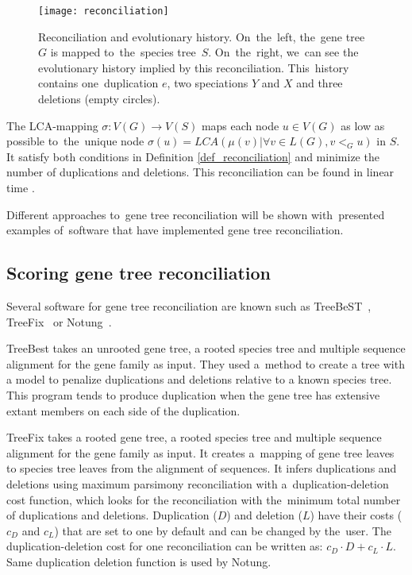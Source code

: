 \begin{figure}[h]
	\centering
	\label{reconciliation}
  	\texttt{[image: reconciliation]}
  	\caption{Reconciliation and evolutionary history. On~the~left, the~gene tree~$G$ is mapped to~the~species tree~$S$. On~the~right, we~can see the evolutionary history implied by this reconciliation. This~history contains one~duplication $e$, two speciations $Y$ and $X$ and three deletions (empty circles).}
\end{figure}

The LCA-mapping $\sigma: V(G) \rightarrow V(S)$ maps each node $u \in V(G)$ as low as possible to~the~unique node $\sigma(u) = LCA(\mu(v) | \forall v \in L(G), v<_Gu)$ in $S$. It satisfy both conditions in Definition \ref{def_reconciliation} and minimize the number of duplications and deletions. This reconciliation can be found in linear time \cite{hasic}.

Different approaches to~gene tree reconciliation will be shown with~presented examples of~software that have implemented gene tree reconciliation. 


\subsection{Scoring gene tree reconciliation}
Several software for gene tree reconciliation are known such as TreeBeST~\cite{treebest}, TreeFix~\cite{treefix} or Notung~\cite{notung}. 

TreeBest takes an unrooted gene tree, a rooted species tree and multiple sequence alignment for the gene family as input. They used a~method to create a tree with a model to penalize duplications and deletions relative to a known species tree. This program tends to produce duplication when the gene tree has extensive extant members on each side of the duplication.

TreeFix takes a rooted gene tree, a rooted species tree and multiple sequence alignment for the gene family as input. It creates a~mapping of gene tree leaves to species tree leaves from the alignment of sequences. It infers duplications and deletions using maximum parsimony reconciliation with a~duplication-deletion cost function, which looks for the reconciliation with the~minimum total number of duplications and deletions. Duplication ($D$) and deletion ($L$) have their costs ($c_D$ and $c_L$) that are set to one by default and can be changed by the~user. The duplication-deletion cost for one reconciliation can be written as: $c_D \cdot D+c_L \cdot L$. Same duplication deletion function is used by Notung.


